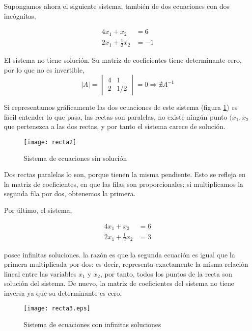 Supongamos ahora el siguiente sistema, también de dos ecuaciones con dos incógnitas,

\begin{align*}
4x_1+x_2&=6\\
2x_1+\frac{1}{2} x_2&=-1
\end{align*}

El sistema no tiene solución. Su matriz de coeficientes tiene determinante cero, por lo que no es invertible,
\begin{equation*}
\vert A \vert =\begin{vmatrix}
4& 1\\
2& 1/2
\end{vmatrix} =0 \Rightarrow \nexists A^{-1}
\end{equation*}

Si representamos gráficamente las dos ecuaciones de este sistema (figura \ref{fig:recta2}) es fácil entender lo que pasa, las rectas son paralelas, no existe ningún punto $(x_1,x_2$ que pertenezca a las dos rectas, y por tanto el sistema carece de solución.

\begin{figure}[h]
\centering
\texttt{[image: recta2]}
\caption{Sistema de ecuaciones sin solución}
\label{fig:recta2}
\end{figure}

Dos rectas paralelas lo son, porque tienen la misma pendiente. Esto se refleja en la matriz de coeficientes, en que las filas son proporcionales; si multiplicamos la segunda fila por dos, obtenemos la primera. 

Por último, el sistema,

\begin{align*}
4x_1+x_2&=6\\
2x_1+\frac{1}{2} x_2&=3
\end{align*}

posee infinitas soluciones. la razón es que la segunda ecuación es igual que la primera multiplicada por dos: es decir, representa exactamente la misma relación lineal entre las variables $x_1$ y $x_2$, por tanto, todos los puntos de la recta son solución del sistema. De nuevo, la matriz de coeficientes del sistema no tiene inversa ya que su determinante es cero.

\begin{figure}[h]
\centering
\texttt{[image: recta3.eps]}
\caption{Sistema de ecuaciones con infinitas soluciones}
\label{recta3}
\end{figure}

